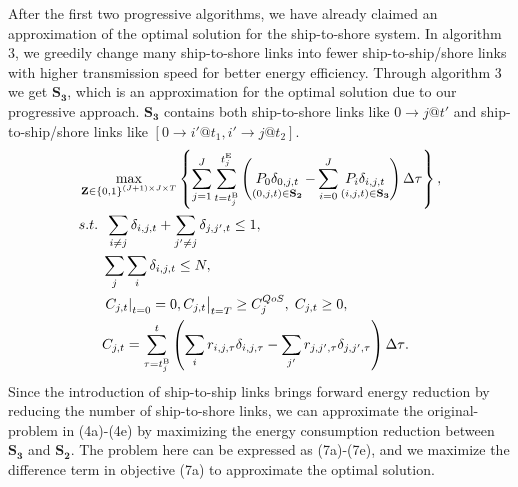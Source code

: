 \documentclass[conference]{IEEEtran}
\begin{document}
After the first two progressive algorithms, we have already claimed an approximation of the optimal solution for the ship-to-shore system. 
In algorithm 3, we greedily change many ship-to-shore links into fewer ship-to-ship/shore links with higher transmission speed for better energy efficiency. Through algorithm 3 we get ${{\mathbf{S}}_{\mathbf{3}}}$, which is an approximation for the optimal solution due to our progressive approach. ${{\mathbf{S}}_{\mathbf{3}}}$ contains both ship-to-shore links like $0 \to j@t'$ and ship-to-ship/shore links like $\left[ {0 \to i'@{t_1},i' \to j@{t_2}} \right]$. 
\begin{subequations}
  \begin{align}
  & \mathop {\max }\limits_{{\mathbf{Z}} \in {{\left\{ {0,1} \right\}}^{\left( {J + 1} \right) \times J \times T}}} \left\{ {{\sum\limits_{j = 1}^J \sum\limits_{t = {t_j^{\rm{B}}}}^{t_j^{\rm{E}}}{\left(  {\mathop {{P_{0}}\delta _{0,j,t} }\limits_{\left( {0,j,t} \right) \in {{\mathbf{S}}_{\mathbf{2}}}}  - \sum\limits_{i = 0}^J {\mathop {{P_{i}}\delta _{i,j,t}}\limits_{\left( {i,j,t} \right) \in {{\mathbf{S}}_{\mathbf{3}}}} } } \right) \Delta \tau } } } \right\}, \\
  & {s.t.} \;\; \sum\limits_{i \ne j} { {{\delta _{i,j,t}}}  }  + \sum\limits_{j' \ne j} { {{\delta _{j,j',t}}}  \le {1}}, \\
  & \;\;\;\;\;\; \sum\limits_j {\sum\limits_i {  {{\delta _{i,j,t}}} } }  \le N, \\
  & \;\;\;\;\;\; {\left. {{{\left. {{C_{j,t}}} \right|}_{t = 0}} = 0, {C_{j,t}}} \right|_{t = T}} \ge C_j^{QoS} ,\; {C_{j,t}} \ge 0, \\
  & \;\;\;\;\;\; {C_{j,t}} = \sum\limits_{\tau  = t_j^{\rm{B}}}^t {\left( {\sum\limits_i {{r_{i,j,\tau }}\delta _{i,j,\tau}}  - \sum\limits_{j'} {{r_{j,j',\tau }}\delta _{j,j',\tau}} } \right)\Delta \tau} .
  \end{align}
  \end{subequations}
Since the introduction of ship-to-ship links brings forward energy reduction by reducing the number of ship-to-shore links, we can approximate the original-problem in (4a)-(4e) by maximizing the energy consumption reduction between ${{\mathbf{S}}_{\mathbf{3}}}$ and ${{\mathbf{S}}_{\mathbf{2}}}$. The problem here can be expressed as (7a)-(7e), and we maximize the difference term in objective (7a) to approximate the optimal solution. 
\end{document}
